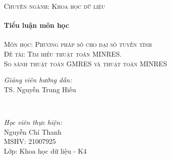 \documentclass[14pt, a4paper]{article}
\numberwithin{equation}{section}
\numberwithin{algorithm}{section}
\numberwithin{figure}{section}
\numberwithin{dl}{section}
\numberwithin{md}{section}
\numberwithin{bd}{section}
\begin{document}
\begin{titlepage}
    \textsc{\Large Chuyên ngành: Khoa học dữ liệu}\\[0.5cm] %

    
    
    \HRule \\[0.4cm]
    { \huge \bfseries Tiểu luận môn học}\\[0.4cm] %
    \HRule \\[1.5cm]

    \textsc{\Large Môn học: Phương pháp số cho đại số tuyến tính }\\[1.5cm] %


    \textsc{\Large Đề tài: Tìm hiểu thuật toán MINRES.\\So sánh thuật toán GMRES và thuật toán MINRES }\\[1.5cm]
     

    \begin{minipage}{0.4\textwidth}
        \begin{flushleft} \Large
        \emph{Giảng viên hướng dẫn:} \\
        TS. Nguyễn Trung Hiếu %
        \end{flushleft}
    \end{minipage}\\[2cm]

    \begin{minipage}{0.4\textwidth}
    \begin{flushleft} \Large
    \emph{Học viên thực hiện:}\\
    Nguyễn Chí Thanh \\
    MSHV: 21007925 \\ %
    Lớp: Khoa học dữ liệu - K4
    \end{flushleft}
    \end{minipage}
    
    
    

\end{titlepage}
\end{document}
